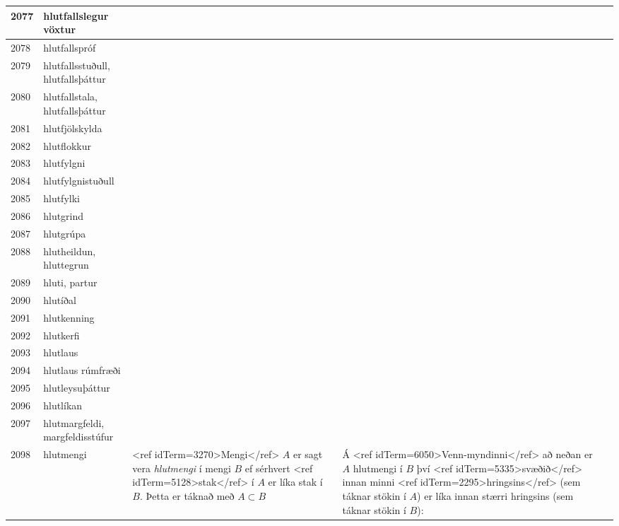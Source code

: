 \begin{longtable}{p{}|p{}|p{}|p{}|p{}}
\hline
2077 & hlutfallslegur vöxtur &  &  &  \\
\hline
2078 & hlutfallspróf &  &  &  \\
\hline
2079 & hlutfallsstuðull, hlutfallsþáttur &  &  &  \\
\hline
2080 & hlutfallstala, hlutfallsþáttur &  &  &  \\
\hline
2081 & hlutfjölskylda &  &  &  \\
\hline
2082 & hlutflokkur &  &  &  \\
\hline
2083 & hlutfylgni &  &  &  \\
\hline
2084 & hlutfylgnistuðull &  &  &  \\
\hline
2085 & hlutfylki &  &  &  \\
\hline
2086 & hlutgrind &  &  &  \\
\hline
2087 & hlutgrúpa &  &  &  \\
\hline
2088 & hlutheildun, hluttegrun &  &  &  \\
\hline
2089 & hluti, partur &  &  &  \\
\hline
2090 & hlutíðal &  &  &  \\
\hline
2091 & hlutkenning &  &  &  \\
\hline
2092 & hlutkerfi &  &  &  \\
\hline
2093 & hlutlaus &  &  &  \\
\hline
2094 & hlutlaus rúmfræði &  &  &  \\
\hline
2095 & hlutleysuþáttur &  &  &  \\
\hline
2096 & hlutlíkan &  &  &  \\
\hline
2097 & hlutmargfeldi, margfeldisstúfur &  &  &  \\
\hline
2098 & hlutmengi & <ref idTerm=3270>Mengi</ref> $A$ er sagt vera \textit{hlutmengi} í mengi $B$ ef sérhvert <ref idTerm=5128>stak</ref> í $A$ er líka stak í $B$. Þetta er táknað með $A \subset B$ & Á <ref idTerm=6050>Venn-myndinni</ref> að neðan er $A$ hlutmengi í $B$ því <ref idTerm=5335>svæðið</ref> innan minni <ref idTerm=2295>hringsins</ref> (sem táknar stökin í $A$) er líka innan stærri hringsins (sem táknar stökin í $B$):


\end{longtable}
